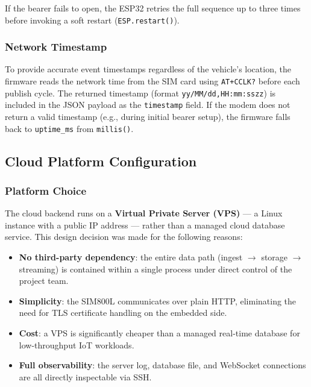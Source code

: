 If the bearer fails to open, the ESP32 retries the full sequence up to three times before invoking a soft restart (\texttt{ESP.restart()}).

\subsubsection{Network Timestamp}

To provide accurate event timestamps regardless of the vehicle's location, the firmware reads the network time from the SIM card using \texttt{AT+CCLK?} before each publish cycle. The returned timestamp (format \texttt{yy/MM/dd,HH:mm:ss\textpm zz}) is included in the JSON payload as the \texttt{timestamp} field. If the modem does not return a valid timestamp (e.g., during initial bearer setup), the firmware falls back to \texttt{uptime\_ms} from \texttt{millis()}.

\subsection{Cloud Platform Configuration}

\subsubsection{Platform Choice}

The cloud backend runs on a \textbf{Virtual Private Server (VPS)} — a Linux instance with a public IP address — rather than a managed cloud database service. This design decision was made for the following reasons:

\begin{itemize}
    \item \textbf{No third-party dependency}: the entire data path (ingest $\rightarrow$ storage $\rightarrow$ streaming) is contained within a single process under direct control of the project team.
    \item \textbf{Simplicity}: the SIM800L communicates over plain HTTP, eliminating the need for TLS certificate handling on the embedded side.
    \item \textbf{Cost}: a VPS is significantly cheaper than a managed real-time database for low-throughput IoT workloads.
    \item \textbf{Full observability}: the server log, database file, and WebSocket connections are all directly inspectable via SSH.
\end{itemize}

